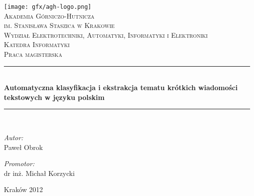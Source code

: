 \documentclass[11pt,a4paper]{article}
\newcommand{\HRule}{\rule{\linewidth}{0.5mm}}
\begin{document}
\begin{titlepage}

\begin{center}
\texttt{[image: gfx/agh-logo.png]}\\[1cm]

\textsc{\LARGE Akademia Górniczo-Hutnicza\\im. Stanisława Staszica w Krakowie}\\[0.5cm]
\textsc{\Large Wydział Elektrotechniki, Automatyki, Informatyki i Elektroniki}\\[0.5cm]
\textsc{\Large Katedra Informatyki}\\[1.5cm]
\textsc{\Large Praca magisterska}\\[0.5cm]

\HRule \\[0.4cm]
{ \Large \bfseries Automatyczna klasyfikacja i ekstrakcja tematu krótkich wiadomości tekstowych w języku polskim}\\[0.4cm]

\HRule \\[1.5cm]
\begin{minipage}{0.4\textwidth}
\begin{flushleft} \large
\emph{Autor:}\\
Paweł Obrok
\end{flushleft}
\end{minipage}
\begin{minipage}{0.4\textwidth}
\begin{flushright} \large
\emph{Promotor:} \\
dr inż. Michał Korzycki
\end{flushright}
\end{minipage}

\vfill

{\large Kraków 2012}

\end{center}
\end{titlepage}
\end{document}
